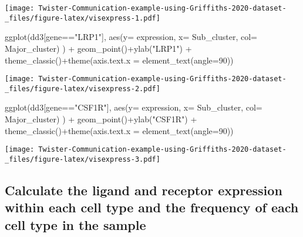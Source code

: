 \documentclass[
]{article}
\newenvironment{Shaded}{\begin{snugshade}}{\end{snugshade}}
\newcommand{\AttributeTok}[1]{\textcolor[rgb]{0.77,0.63,0.00}{#1}}
\newcommand{\DecValTok}[1]{\textcolor[rgb]{0.00,0.00,0.81}{#1}}
\newcommand{\FunctionTok}[1]{\textcolor[rgb]{0.00,0.00,0.00}{#1}}
\newcommand{\NormalTok}[1]{#1}
\newcommand{\SpecialCharTok}[1]{\textcolor[rgb]{0.00,0.00,0.00}{#1}}
\newcommand{\StringTok}[1]{\textcolor[rgb]{0.31,0.60,0.02}{#1}}
\begin{document}
\texttt{[image: Twister-Communication-example-using-Griffiths-2020-dataset-\_files/figure-latex/visexpress-1.pdf]}

\begin{Shaded}
\begin{Highlighting}[]
\FunctionTok{ggplot}\NormalTok{(dd3[gene}\SpecialCharTok{==}\StringTok{"LRP1"}\NormalTok{], }\FunctionTok{aes}\NormalTok{(}\AttributeTok{y=}\NormalTok{ expression, }\AttributeTok{x=}\NormalTok{ Sub\_cluster, }\AttributeTok{col=}\NormalTok{ Major\_cluster) ) }\SpecialCharTok{+} \FunctionTok{geom\_point}\NormalTok{()}\SpecialCharTok{+}\FunctionTok{ylab}\NormalTok{(}\StringTok{"LRP1"}\NormalTok{) }\SpecialCharTok{+} \FunctionTok{theme\_classic}\NormalTok{()}\SpecialCharTok{+}\FunctionTok{theme}\NormalTok{(}\AttributeTok{axis.text.x =} \FunctionTok{element\_text}\NormalTok{(}\AttributeTok{angle=}\DecValTok{90}\NormalTok{))}
\end{Highlighting}
\end{Shaded}

\texttt{[image: Twister-Communication-example-using-Griffiths-2020-dataset-\_files/figure-latex/visexpress-2.pdf]}

\begin{Shaded}
\begin{Highlighting}[]
\FunctionTok{ggplot}\NormalTok{(dd3[gene}\SpecialCharTok{==}\StringTok{"CSF1R"}\NormalTok{], }\FunctionTok{aes}\NormalTok{(}\AttributeTok{y=}\NormalTok{ expression, }\AttributeTok{x=}\NormalTok{ Sub\_cluster, }\AttributeTok{col=}\NormalTok{ Major\_cluster) ) }\SpecialCharTok{+} \FunctionTok{geom\_point}\NormalTok{()}\SpecialCharTok{+}\FunctionTok{ylab}\NormalTok{(}\StringTok{"CSF1R"}\NormalTok{) }\SpecialCharTok{+} \FunctionTok{theme\_classic}\NormalTok{()}\SpecialCharTok{+}\FunctionTok{theme}\NormalTok{(}\AttributeTok{axis.text.x =} \FunctionTok{element\_text}\NormalTok{(}\AttributeTok{angle=}\DecValTok{90}\NormalTok{))}
\end{Highlighting}
\end{Shaded}

\texttt{[image: Twister-Communication-example-using-Griffiths-2020-dataset-\_files/figure-latex/visexpress-3.pdf]}

\hypertarget{calculate-the-ligand-and-receptor-expression-within-each-cell-type-and-the-frequency-of-each-cell-type-in-the-sample}{%
\subsection{Calculate the ligand and receptor expression within each
cell type and the frequency of each cell type in the
sample}\label{calculate-the-ligand-and-receptor-expression-within-each-cell-type-and-the-frequency-of-each-cell-type-in-the-sample}}
\end{document}
